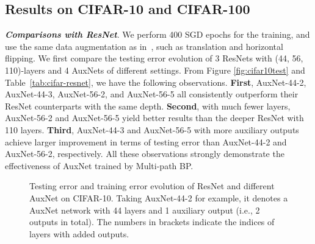 \documentclass[10pt,onecolumn,letterpaper]{article}
\def\SexyName{AuxNet\xspace}
\begin{document}




\subsection{Results on CIFAR-10 and CIFAR-100}\label{exp:main_results}
\noindent \emph{\textbf{Comparisons with ResNet}}.
We perform 400 SGD epochs for the training, and use the same data augmentation as in~\cite{Lee2015}, such as translation and horizontal flipping.
We first compare  the testing error evolution of 3 ResNets with (44, 56, 110)-layers  and 4 AuxNets of different settings. From Figure \ref{fig:cifar10test} and Table~\ref{tab:cifar-resnet}, we have the following observations.
\textbf{First}, \SexyName-44-2, \SexyName-44-3, \SexyName-56-2, and \SexyName-56-5 all consistently outperform their ResNet counterparts with the same depth.
\textbf{Second}, with much fewer layers, \SexyName-56-2 and \SexyName-56-5 yield better results than the deeper ResNet with 110 layers.
\textbf{Third}, \SexyName-44-3 and \SexyName-56-5 with more auxiliary outputs achieve larger improvement in terms of testing error than \SexyName-44-2 and \SexyName-56-2, respectively. All these observations strongly demonstrate the effectiveness of \SexyName trained by Multi-path BP.

\begin{figure}[t]
\centering
{}

\caption{Testing error and training error evolution of ResNet and different \SexyName on CIFAR-10. Taking \SexyName-44-2 for example, it denotes a \SexyName network with 44 layers and 1 auxiliary output (i.e., 2 outputs in total). The numbers in brackets indicate the indices of layers with added outputs.}
\label{fig:cifar}
\end{figure}
\end{document}
